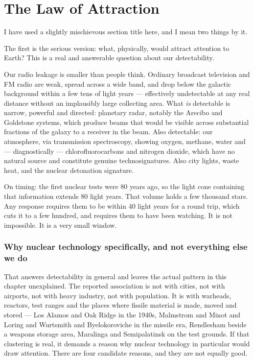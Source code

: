 \section{The Law of Attraction}\label{sec:lawattraction}

I have used a slightly mischievous section title here, and I mean two things by it.

The first is the serious version: what, physically, would attract attention to Earth? This is a
real and answerable question about our detectability.

Our radio leakage is smaller than people think. Ordinary broadcast television and FM radio are
weak, spread across a wide band, and drop below the galactic background within a few tens of light
years --- effectively undetectable at any real distance without an implausibly large collecting
area. What \emph{is} detectable is narrow, powerful and directed: planetary radar, notably the
Arecibo and Goldstone systems, which produce beams that would be visible across substantial
fractions of the galaxy to a receiver in the beam. Also detectable: our atmosphere, via
transmission spectroscopy, showing oxygen, methane, water and --- diagnostically ---
chlorofluorocarbons and nitrogen dioxide, which have no natural source and constitute genuine
technosignatures. Also city lights, waste heat, and the nuclear detonation signature.

On timing: the first nuclear tests were 80 years ago, so the light cone containing that
information extends 80 light years. That volume holds a few thousand stars. Any response requires
them to be within 40 light years for a round trip, which cuts it to a few hundred, and requires
them to have been watching. It is not impossible. It is a very small window.

\subsubsection*{Why nuclear technology specifically, and not everything else we do}

That answers detectability in general and leaves the actual pattern in this chapter unexplained.
The reported association is not with cities, not with airports, not with heavy industry, not with
population. It is with warheads, reactors, test ranges and the places where fissile material is
made, moved and stored --- Los Alamos and Oak Ridge in the 1940s, Malmstrom and Minot and Loring
and Wurtsmith and Byelokoroviche in the missile era, Rendlesham beside a weapons storage area,
Maralinga and Semipalatinsk on the test grounds. If that clustering is real, it demands a reason
why nuclear technology in particular would draw attention. There are four candidate reasons, and
they are not equally good.

